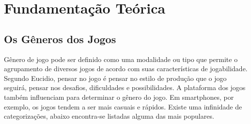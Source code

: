 \chapter{Fundamentação Teórica}
\label{cap:fundamentacao-teorica}


\section{Os Gêneros dos Jogos}
\label{sec:os-generos-dos-jogos}

Gênero de jogo pode ser definido como uma modalidade ou tipo que permite o agrupamento de diversos jogos de acordo com suas características de jogabilidade.
Segundo Eucidio, pensar no jogo é pensar no estilo de produção que o jogo seguirá, pensar nos desafios, dificuldades e possibilidades.
A plataforma dos jogos também influenciam para determinar o gênero do jogo. Em smartphones, por exemplo, os jogos tendem a ser mais casuais e rápidos. Existe uma infinidade de categorizações, abaixo encontra-se listadas alguma das mais populares. 

